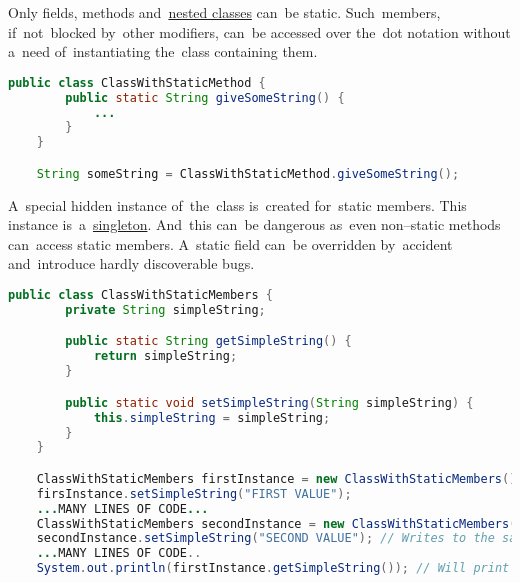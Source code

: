 \label{javaaccessmodifiers}

\label{javapublic}

\label{javaprotected}

\label{javaprivate}

\label{javastatic}
Only fields, methods and~\hyperref[javanestedstaticclasses]{nested classes} can~be static.
Such~members, if~not~blocked by~other modifiers, can~be accessed over the~dot notation without a~need of~instantiating the~class containing them.

\begin{lstlisting}[language=Java]
    public class ClassWithStaticMethod {
        public static String giveSomeString() {
            ...
        }
    }

    String someString = ClassWithStaticMethod.giveSomeString();
\end{lstlisting}

\warning A~special hidden instance of~the~class is~created for~static members.
This instance is~a~\hyperref[singletondp]{singleton}.
And~this can~be dangerous as~even non--static methods can~access static members.
A~static field can~be overridden by~accident and~introduce hardly discoverable bugs.

\begin{lstlisting}[language=Java]
    public class ClassWithStaticMembers {
        private String simpleString;

        public static String getSimpleString() {
            return simpleString;
        }

        public static void setSimpleString(String simpleString) {
            this.simpleString = simpleString;
        }
    }

    ClassWithStaticMembers firstInstance = new ClassWithStaticMembers();
    firsInstance.setSimpleString("FIRST VALUE");
    ...MANY LINES OF CODE...
    ClassWithStaticMembers secondInstance = new ClassWithStaticMembers();
    secondInstance.setSimpleString("SECOND VALUE"); // Writes to the same instance
    ...MANY LINES OF CODE..
    System.out.println(firstInstance.getSimpleString()); // Will print "SECOND VALUE"
\end{lstlisting}

\label{javafinal}

\label{javasynchronized}

\label{noaccessmodifier}
